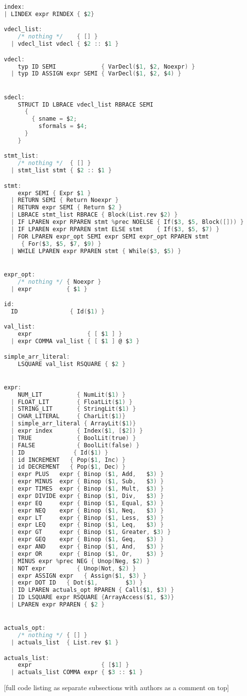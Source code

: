 \documentclass{article}
\begin{document}
\begin{lstlisting}[language=C]
index:
| LINDEX expr RINDEX { $2}

vdecl_list:
    /* nothing */    { [] }
  | vdecl_list vdecl { $2 :: $1 }

vdecl:
    typ ID SEMI             { VarDecl($1, $2, Noexpr) }
  | typ ID ASSIGN expr SEMI { VarDecl($1, $2, $4) }


sdecl:
    STRUCT ID LBRACE vdecl_list RBRACE SEMI
      { 
        { sname = $2;
          sformals = $4;
      } 
    }

stmt_list:
    /* nothing */  { [] }
  | stmt_list stmt { $2 :: $1 }

stmt:
    expr SEMI { Expr $1 }
  | RETURN SEMI { Return Noexpr }
  | RETURN expr SEMI { Return $2 }
  | LBRACE stmt_list RBRACE { Block(List.rev $2) }
  | IF LPAREN expr RPAREN stmt %prec NOELSE { If($3, $5, Block([])) }
  | IF LPAREN expr RPAREN stmt ELSE stmt    { If($3, $5, $7) }
  | FOR LPAREN expr_opt SEMI expr SEMI expr_opt RPAREN stmt
     { For($3, $5, $7, $9) }
  | WHILE LPAREN expr RPAREN stmt { While($3, $5) }


expr_opt:
    /* nothing */ { Noexpr }
  | expr          { $1 }

id:
  ID               { Id($1) }

val_list:
    expr                { [ $1 ] }
  | expr COMMA val_list { [ $1 ] @ $3 }

simple_arr_literal:
    LSQUARE val_list RSQUARE { $2 }


expr:
    NUM_LIT          { NumLit($1) }
  | FLOAT_LIT        { FloatLit($1) }
  | STRING_LIT       { StringLit($1) }
  | CHAR_LITERAL     { CharLit($1)}
  | simple_arr_literal { ArrayLit($1)}
  | expr index       { Index($1, [$2]) }
  | TRUE             { BoolLit(true) }
  | FALSE            { BoolLit(false) }
  | ID              { Id($1) }
  | id INCREMENT   { Pop($1, Inc) }
  | id DECREMENT   { Pop($1, Dec) }
  | expr PLUS   expr { Binop ($1, Add,   $3) }
  | expr MINUS  expr { Binop ($1, Sub,   $3) }
  | expr TIMES  expr { Binop ($1, Mult,  $3) }
  | expr DIVIDE expr { Binop ($1, Div,   $3) }
  | expr EQ     expr { Binop ($1, Equal, $3) }
  | expr NEQ    expr { Binop ($1, Neq,   $3) }
  | expr LT     expr { Binop ($1, Less,  $3) }
  | expr LEQ    expr { Binop ($1, Leq,   $3) }
  | expr GT     expr { Binop ($1, Greater, $3) }
  | expr GEQ    expr { Binop ($1, Geq,   $3) }
  | expr AND    expr { Binop ($1, And,   $3) }
  | expr OR     expr { Binop ($1, Or,    $3) }
  | MINUS expr %prec NEG { Unop(Neg, $2) }
  | NOT expr         { Unop(Not, $2) }
  | expr ASSIGN expr   { Assign($1, $3) }
  | expr DOT ID   { Dot($1,        $3) }
  | ID LPAREN actuals_opt RPAREN { Call($1, $3) }
  | ID LSQUARE expr RSQUARE {ArrayAccess($1, $3)}
  | LPAREN expr RPAREN { $2 }


actuals_opt:
    /* nothing */ { [] }
  | actuals_list  { List.rev $1 }

actuals_list:
    expr                    { [$1] }
  | actuals_list COMMA expr { $3 :: $1 }

\end{lstlisting}

[full code listing as separate subsections with authors as a comment on top]
\end{document}
